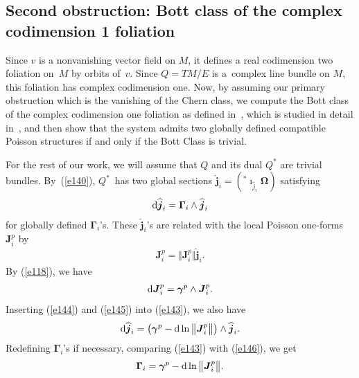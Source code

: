 \documentclass[10pt,a4paper]{amsart}
\numberwithin{equation}{section}
\begin{document}
\subsection{Second obstruction: Bott class of the complex codimension 1 foliation}\label{section3.3}

Since $v$ is a nonvanishing vector f\/ield on $M$, it def\/ines a real codimension two foliation on~$M$ by orbits of~$v$. Since $Q=TM/E$ is a~complex line bundle on $M$, this foliation has complex codimension one. Now, by assuming our primary obstruction which is the vanishing of the Chern class, we compute the Bott class of the complex codimension one foliation as def\/ined in~\cite{Bott}, which is studied in detail in~\cite{Taro}, and then show that the system admits two globally def\/ined compatible Poisson structures if and only if the Bott Class is trivial.

For the rest of our work, we will assume that $Q$ and its dual $Q^{\ast }$ are trivial bundles. By~(\ref{e140}), $Q^{\ast }$~has two global sections $\widehat{\boldsymbol{j}}_{i} = ( ^{\ast }\imath _{\widehat{j}_{i}}\boldsymbol{\Omega } )$ satisfying
\begin{gather}
{\rm d}\widehat{\boldsymbol{j}}_{i}=\boldsymbol{\Gamma }_{i}\wedge \widehat{\boldsymbol{j}}_{i}\label{e143}
\end{gather}
for globally def\/ined $\boldsymbol{\Gamma }_{i}$'s. These $\widehat{\boldsymbol{j}}_{i}$'s are related with the local Poisson one-forms $\boldsymbol{J}_{i}^{p}$ by
\begin{gather}
\boldsymbol{J}_{i}^{p}=\big\Vert \boldsymbol{J}_{i}^{p}\big\Vert \widehat{\boldsymbol{j}}_{i}. \label{e144}
\end{gather}
By (\ref{e118}), we have
\begin{gather}
{\rm d}\boldsymbol{J}_{i}^{p}=\boldsymbol{\gamma }^{p}\wedge \boldsymbol{J}_{i}^{p}.\label{e145}
\end{gather}
Inserting (\ref{e144}) and (\ref{e145}) into (\ref{e143}), we also have
\begin{gather}
{\rm d}\widehat{\boldsymbol{j}}_{i}=\big( \boldsymbol{\gamma }^{p}-{\rm d}\ln \big\Vert \boldsymbol{J}_{i}^{p}\big\Vert \big) \wedge \widehat{\boldsymbol{j}}_{i}. \label{e146}
\end{gather}
Redef\/ining $\boldsymbol{\Gamma} _{i}$'s if necessary, comparing (\ref{e143}) with (\ref{e146}), we get
\begin{gather}
\boldsymbol{\Gamma }_{i}=\boldsymbol{\gamma }^{p}-{\rm d}\ln \big\Vert \boldsymbol{J}_{i}^{p}\big\Vert. \label{e147}
\end{gather}
\end{document}
